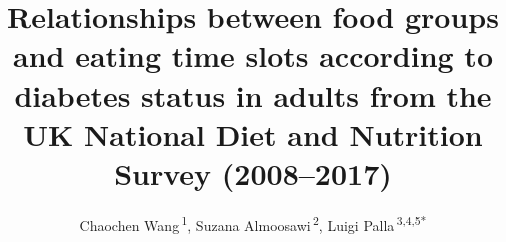 \documentclass[utf8]{frontiersSCNS}
\def\Authors{
  Chaochen Wang\,\textsuperscript{1},
  Suzana Almoosawi\,\textsuperscript{2},
  Luigi Palla\,\textsuperscript{3,4,5*}}
\def\firstAuthorLast{WANG {et~al.}}
\begin{document}
\onecolumn
{}

\title[Food groups choice and time of consumption.]{Relationships
between food groups and eating time slots according to diabetes status
in adults from the UK National Diet and Nutrition Survey (2008--2017)}
\author[\firstAuthorLast]{\Authors}
\address{} %
\correspondance{} %

\extraAuth{}%


\maketitle
\end{document}

